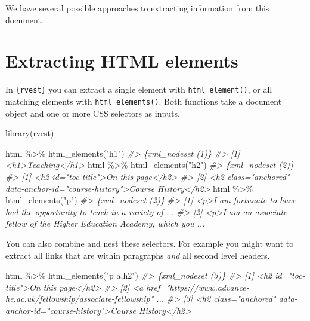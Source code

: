 \documentclass[
  12pt,
]{book}
\newenvironment{Shaded}{\begin{snugshade}}{\end{snugshade}}
\newcommand{\CommentTok}[1]{\textcolor[rgb]{0.56,0.35,0.01}{\textit{#1}}}
\newcommand{\FunctionTok}[1]{\textcolor[rgb]{0.00,0.00,0.00}{#1}}
\newcommand{\NormalTok}[1]{#1}
\newcommand{\SpecialCharTok}[1]{\textcolor[rgb]{0.00,0.00,0.00}{#1}}
\newcommand{\StringTok}[1]{\textcolor[rgb]{0.31,0.60,0.02}{#1}}
\begin{document}
We have several possible approaches to extracting information from this document.

\hypertarget{extracting-html-elements}{%
\section{Extracting HTML elements}\label{extracting-html-elements}}

In \texttt{\{rvest\}} you can extract a single element with \texttt{html\_element()}, or all matching elements with \texttt{html\_elements()}. Both functions take a document object and one or more CSS selectors as inputs.

\begin{Shaded}
\begin{Highlighting}[]
\FunctionTok{library}\NormalTok{(rvest)}

\NormalTok{html }\SpecialCharTok{\%\textgreater{}\%} \FunctionTok{html\_elements}\NormalTok{(}\StringTok{"h1"}\NormalTok{)}
\CommentTok{\#\textgreater{} \{xml\_nodeset (1)\}}
\CommentTok{\#\textgreater{} [1] \textless{}h1\textgreater{}Teaching\textless{}/h1\textgreater{}}
\NormalTok{html }\SpecialCharTok{\%\textgreater{}\%} \FunctionTok{html\_elements}\NormalTok{(}\StringTok{"h2"}\NormalTok{)}
\CommentTok{\#\textgreater{} \{xml\_nodeset (2)\}}
\CommentTok{\#\textgreater{} [1] \textless{}h2 id="toc{-}title"\textgreater{}On this page\textless{}/h2\textgreater{}}
\CommentTok{\#\textgreater{} [2] \textless{}h2 class="anchored" data{-}anchor{-}id="course{-}history"\textgreater{}Course History\textless{}/h2\textgreater{}}
\NormalTok{html }\SpecialCharTok{\%\textgreater{}\%} \FunctionTok{html\_elements}\NormalTok{(}\StringTok{"p"}\NormalTok{)}
\CommentTok{\#\textgreater{} \{xml\_nodeset (2)\}}
\CommentTok{\#\textgreater{} [1] \textless{}p\textgreater{}I am fortunate to have had the opportunity to teach in a variety of ...}
\CommentTok{\#\textgreater{} [2] \textless{}p\textgreater{}I am an associate fellow of the Higher Education Academy, which you ...}
\end{Highlighting}
\end{Shaded}

You can also combine and nest these selectors. For example you might want to extract all links that are within paragraphs \emph{and} all second level headers.

\begin{Shaded}
\begin{Highlighting}[]
\NormalTok{html }\SpecialCharTok{\%\textgreater{}\%} \FunctionTok{html\_elements}\NormalTok{(}\StringTok{"p a,h2"}\NormalTok{)}
\CommentTok{\#\textgreater{} \{xml\_nodeset (3)\}}
\CommentTok{\#\textgreater{} [1] \textless{}h2 id="toc{-}title"\textgreater{}On this page\textless{}/h2\textgreater{}}
\CommentTok{\#\textgreater{} [2] \textless{}a href="https://www.advance{-}he.ac.uk/fellowship/associate{-}fellowship" ...}
\CommentTok{\#\textgreater{} [3] \textless{}h2 class="anchored" data{-}anchor{-}id="course{-}history"\textgreater{}Course History\textless{}/h2\textgreater{}}
\end{Highlighting}
\end{Shaded}
\end{document}
